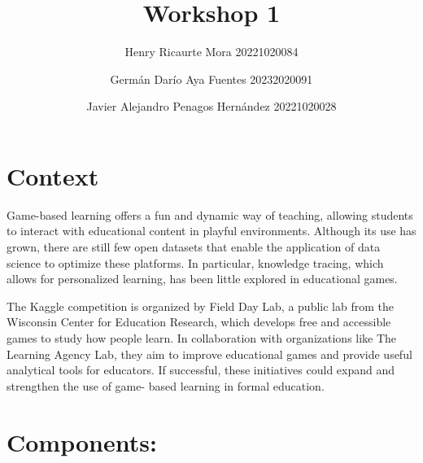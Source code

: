 \documentclass{article}
\title{Workshop 1}
\author{Henry Ricaurte Mora 20221020084}
\author{Germán Darío Aya Fuentes 20232020091}
\author{Javier Alejandro Penagos Hernández 20221020028}
\date{}
\begin{document}
\maketitle


\section*{Context}

Game-based learning offers a fun and dynamic way of teaching, allowing
students to interact with educational content in playful environments.
Although its use has grown, there are still few open datasets that enable 
the application of data science to optimize these platforms. In 
particular, knowledge tracing, which allows for personalized learning, has
been little explored in educational games. 

The Kaggle competition is organized by Field Day Lab, a public lab from
the Wisconsin Center for Education Research, which develops free and 
accessible games to study how people learn. In collaboration with 
organizations like The Learning Agency Lab, they aim to improve 
educational games and provide useful analytical tools for educators. If 
successful, these initiatives could expand and strengthen the use of game-
based learning in formal education.

\section*{Components: }
\end{document}
